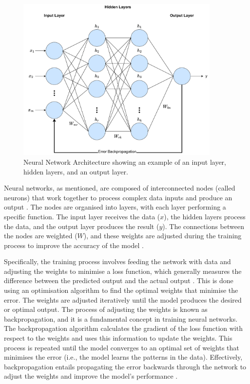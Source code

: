 \begin{figure}[h]
    \centering
    \includegraphics[width=0.9\textwidth]{Figures/flowchart of model process-Neural Nets.pdf} %
    \caption{Neural Network Architecture showing an example of an input layer, hidden layers, and an output layer.}
    \label{fig:neural_network}
  \end{figure}

Neural networks, as mentioned, are composed of interconnected nodes (called neurons) that work together to process complex data inputs and produce an output \cite{gurney2018introduction}. The nodes are organised into layers, with each layer performing a specific function. The input layer receives the data ($x$), the hidden layers process the data, and the output layer produces the result ($y$). The connections between the nodes are weighted ($W$), and these weights are adjusted during the training process to improve the accuracy of the model \cite{abdi1999neural}. 

Specifically, the training process involves feeding the network with data and adjusting the weights to minimise a loss function, which generally measures the difference between the predicted output and the actual output \cite{abdi1999neural}. This is done using an optimisation algorithm to find the optimal weights that minimise the error. The weights are adjusted iteratively until the model produces the desired or optimal output. The process of adjusting the weights is known as backpropagation, and it is a fundamental concept in training neural networks. The backpropagation algorithm calculates the gradient of the loss function with respect to the weights and uses this information to update the weights. This process is repeated until the model converges to an optimal set of weights that minimises the error (i.e., the model learns the patterns in the data). Effectively, backpropagation entails propagating the error backwards through the network to adjust the weights and improve the model's performance \cite{abdi1999neural}. 

